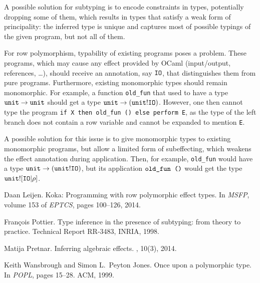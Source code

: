 \documentclass[a4paper,UKenglish]{dagrep}
\begin{document}
A possible solution for subtyping is to encode constraints in types, potentially dropping some of them, which results in types that satisfy a weak form of principality: the inferred type is unique and captures most of possible typings of the given program, but not all of them.

For row polymorphism, typability of existing programs poses a problem. These programs, which may cause any effect provided by OCaml (input/output, references, \ldots), should receive an annotation, say $\mathtt{IO}$, that distinguishes them from pure programs. Furthermore, existing monomorphic types should remain monomorphic. For example, a function \verb|old_fun| that used to have a type $\mathtt{unit} \to \mathtt{unit}$ should get a type $\mathtt{unit} \to (\mathtt{unit} ! \mathtt{IO})$. However, one then cannot type the program \verb|if X then old_fun () else perform E|, as the type of the left branch does not contain a row variable and cannot be expanded to mention \verb|E|.

A possible solution for this issue is to give monomorphic types to existing monomorphic programs, but allow a limited form of subeffecting, which weakens the effect annotation during application. Then, for example, \verb|old_fun| would have a type $\mathtt{unit} \to (\mathtt{unit} ! \mathtt{IO})$, but its application $\verb|old_fun ()|$ would get the type $\mathtt{unit} ! [\mathtt{IO} | \rho]$.

% 
% 

\begin{thebibliography}{1}

Daan Leijen.
\newblock Koka: Programming with row polymorphic effect types.
\newblock In {\em {MSFP}}, volume 153 of {\em {EPTCS}}, pages 100--126, 2014.

Fran{\c{c}}ois Pottier.
\newblock Type inference in the presence of subtyping: from theory to practice.
\newblock Technical Report RR-3483, INRIA, 1998.

Matija Pretnar.
\newblock Inferring algebraic effects.
, 10(3), 2014.

Keith Wansbrough and Simon L.~Peyton Jones.
\newblock Once upon a polymorphic type.
\newblock In {\em {POPL}}, pages 15--28. {ACM}, 1999.

\end{thebibliography}

\end{document}
